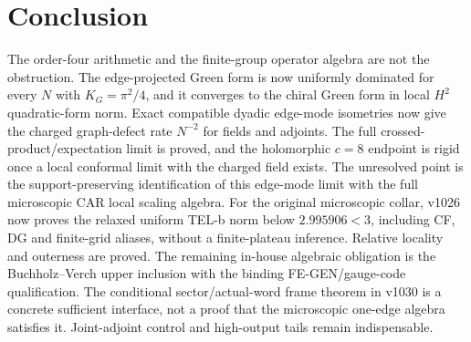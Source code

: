 \section*{Conclusion}

The order-four arithmetic and the finite-group operator algebra are not
the obstruction.  The edge-projected Green form is now uniformly
dominated for every $N$ with $K_G=\pi^2/4$, and it converges to the
chiral Green form in local $H^2$ quadratic-form norm.  Exact compatible
dyadic edge-mode isometries now give the charged graph-defect rate
$N^{-2}$ for fields and adjoints.  The full
crossed-product/expectation limit is proved, and the holomorphic $c=8$
endpoint is rigid once a local conformal limit with the charged field
exists.  The unresolved point is the support-preserving identification
of this edge-mode limit with the full microscopic CAR local scaling
algebra. For the original microscopic collar, v1026 now proves the
relaxed uniform TEL-b norm below $2.995906<3$, including CF, DG and
finite-grid aliases, without a finite-plateau inference. Relative locality and
outerness are proved.  The remaining in-house algebraic obligation is
the Buchholz--Verch upper inclusion with the binding FE-GEN/gauge-code
qualification. The conditional sector/actual-word frame theorem in v1030
is a concrete sufficient interface, not a proof that the microscopic
one-edge algebra satisfies it. Joint-adjoint control and high-output tails
remain indispensable.

